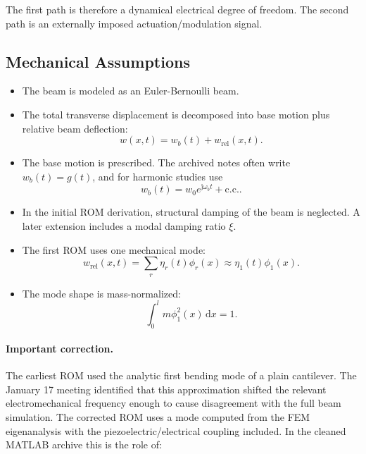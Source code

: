 \documentclass[11pt]{article}
\newcommand{\dd}{\mathrm{d}}
\newcommand{\jj}{\mathrm{j}}
\newcommand{\cc}{\mathrm{c.c.}}
\begin{document}
The first path is therefore a dynamical electrical degree of freedom.  The
second path is an externally imposed actuation/modulation signal.

\subsection{Mechanical Assumptions}

\begin{itemize}
  \item The beam is modeled as an Euler-Bernoulli beam.
  \item The total transverse displacement is decomposed into base motion plus
  relative beam deflection:
  \begin{equation}
    w(x,t)=w_b(t)+w_{\mathrm{rel}}(x,t).
  \end{equation}
  \item The base motion is prescribed.  The archived notes often write
  $w_b(t)=g(t)$, and for harmonic studies use
  \begin{equation}
    w_b(t)=w_0 e^{\jj \omega_b t}+\cc.
  \end{equation}
  \item In the initial ROM derivation, structural damping of the beam is
  neglected.  A later extension includes a modal damping ratio $\xi$.
  \item The first ROM uses one mechanical mode:
  \begin{equation}
    w_{\mathrm{rel}}(x,t)=\sum_r \eta_r(t)\phi_r(x)
    \approx \eta_1(t)\phi_1(x).
  \end{equation}
  \item The mode shape is mass-normalized:
  \begin{equation}
    \int_0^l m\phi_1^2(x)\,\dd x = 1.
  \end{equation}
\end{itemize}

\paragraph{Important correction.}
The earliest ROM used the analytic first bending mode of a plain cantilever.
The January 17 meeting identified that this approximation shifted the relevant
electromechanical frequency enough to cause disagreement with the full beam
simulation.  The corrected ROM uses a mode computed from the FEM eigenanalysis
with the piezoelectric/electrical coupling included.  In the cleaned MATLAB
archive this is the role of:
\end{document}
